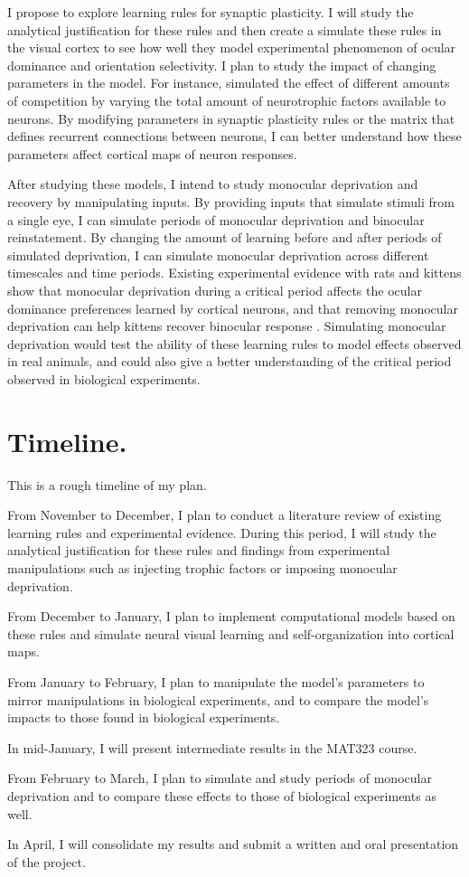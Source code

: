 \documentclass[10pt]{article}
\begin{document}
I propose to explore learning rules for synaptic plasticity. I will study the analytical justification for these rules and then create a simulate these rules in the visual cortex to see how well they model experimental phenomenon of ocular dominance and orientation selectivity. I plan to study the impact of changing parameters in the model. For instance, \cite{Harris1997} simulated the effect of different amounts of competition by varying the total amount of neurotrophic factors available to neurons. By modifying parameters in synaptic plasticity rules or the matrix that defines recurrent connections between neurons, I can better understand how these parameters affect cortical maps of neuron responses.

After studying these models, I intend to study monocular deprivation and recovery by manipulating inputs. By providing inputs that simulate stimuli from a single eye, I can simulate periods of monocular deprivation and binocular reinstatement. By changing the amount of learning before and after periods of simulated deprivation, I can simulate monocular deprivation across different timescales and time periods. Existing experimental evidence with rats and kittens show that monocular deprivation during a critical period affects the ocular dominance preferences learned by cortical neurons, and that removing monocular deprivation can help kittens recover binocular response \cite{Feldman2009}\cite{Mitchell1977}. Simulating monocular deprivation would test the ability of these learning rules to model effects observed in real animals, and could also give a better understanding of the critical period observed in biological experiments. 

\section*{Timeline.}
This is a rough timeline of my plan.

From November to December, I plan to conduct a literature review of existing learning rules and experimental evidence. During this period, I will study the analytical justification for these rules and findings from experimental manipulations such as injecting trophic factors or imposing monocular deprivation.

From December to January, I plan to implement computational models based on these rules and simulate neural visual learning and self-organization into cortical maps.

From January to February, I plan to manipulate the model's parameters to mirror manipulations in biological experiments, and to compare the model's impacts to those found in biological experiments.

In mid-January, I will present intermediate results in the MAT323 course.

From February to March, I plan to simulate and study periods of monocular deprivation and to compare these effects to those of biological experiments as well.

In April, I will consolidate my results and submit a written and oral presentation of the project.



\end{document}
